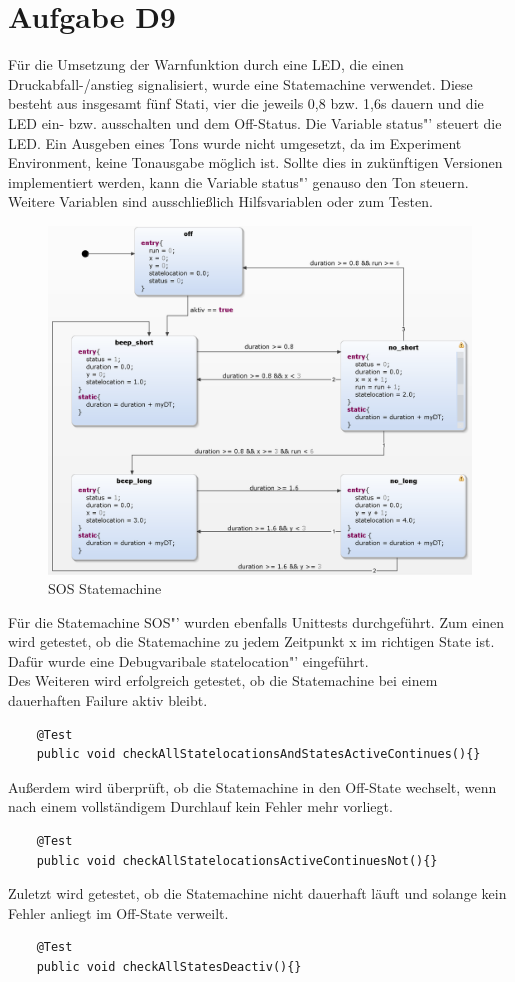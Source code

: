 \chapter{Aufgabe D9}
Für die Umsetzung der Warnfunktion durch eine LED, die einen Druckabfall-/anstieg signalisiert, wurde eine Statemachine verwendet. Diese besteht aus insgesamt fünf Stati, vier die jeweils 0,8 bzw. 1,6s dauern und die LED ein- bzw. ausschalten und dem Off-Status.
Die Variable \glqq status"' steuert die LED. Ein Ausgeben eines Tons wurde nicht umgesetzt, da im Experiment Environment, keine Tonausgabe möglich ist. Sollte dies in zukünftigen Versionen implementiert werden, kann die Variable  \glqq status"' genauso den Ton steuern. Weitere Variablen sind ausschließlich Hilfsvariablen oder zum Testen. 

\begin{figure}[h!]
	\centering
	\includegraphics[width=1\linewidth]{../Graphiken/SOS_state.png}
	\caption{SOS Statemachine}
	\label{fig:SOS_state}
\end{figure}
Für die Statemachine \glqq SOS"' wurden ebenfalls Unittests durchgeführt. Zum einen wird getestet, ob die Statemachine zu jedem Zeitpunkt x im richtigen State ist. Dafür wurde eine Debugvaribale \glqq statelocation"' eingeführt.\\
Des Weiteren wird erfolgreich getestet, ob die Statemachine bei einem dauerhaften Failure aktiv bleibt.
\begin{lstlisting}
	@Test
    public void checkAllStatelocationsAndStatesActiveContinues(){}
  \end{lstlisting}
  
  
  Außerdem wird überprüft, ob die Statemachine in den Off-State wechselt, wenn nach einem vollständigem Durchlauf kein Fehler mehr vorliegt.
\begin{lstlisting}
    @Test
    public void checkAllStatelocationsActiveContinuesNot(){}
   \end{lstlisting} 
   
   
  Zuletzt wird getestet, ob die Statemachine nicht dauerhaft läuft und solange kein Fehler anliegt im Off-State verweilt.
   \begin{lstlisting}
    @Test
    public void checkAllStatesDeactiv(){}
\end{lstlisting}